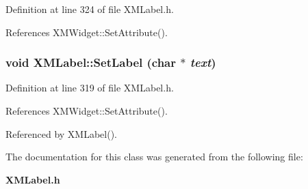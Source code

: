 Definition at line 324 of file XMLabel.h.

References XMWidget::Set\-Attribute().
\subsubsection{\setlength{\rightskip}{0pt plus 5cm}void XMLabel::Set\-Label (char $\ast$ {\em text})\hspace{0.3cm}{\tt  [inline]}}\label{classXMLabel_a4}




Definition at line 319 of file XMLabel.h.

References XMWidget::Set\-Attribute().

Referenced by XMLabel().

The documentation for this class was generated from the following file:\begin{CompactItemize}
\item 
{\bf XMLabel.h}\end{CompactItemize}
